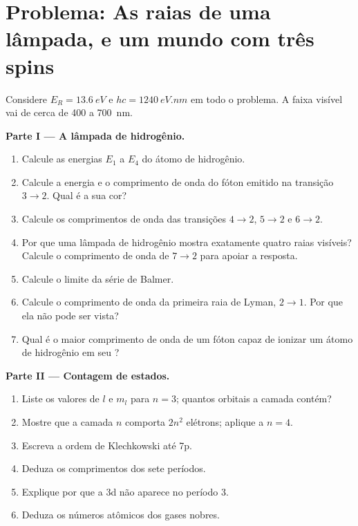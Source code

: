 \section{Problema: As raias de uma lâmpada, e um mundo com três spins}

\begin{problem}
\label{pb:b1:quantum-numbers:1}
Considere $E_R = \qty{13.6}{eV}$ e $hc = \qty{1240}{eV.nm}$ em todo o problema.
A faixa visível vai de cerca de 400 a \qty{700}{nm}.

\medskip
\noindent\textbf{Parte I --- A lâmpada de hidrogênio.}
\begin{enumerate}
  \item Calcule as energias $E_1$ a $E_4$ do átomo de hidrogênio.
  \item Calcule a energia e o comprimento de onda do fóton emitido na
        transição $3 \to 2$. Qual é a sua cor?
  \item Calcule os comprimentos de onda das transições $4 \to 2$, $5 \to 2$
        e $6 \to 2$.
  \item Por que uma lâmpada de hidrogênio mostra exatamente quatro raias
        visíveis? Calcule o comprimento de onda de $7 \to 2$ para apoiar a resposta.
  \item Calcule o limite da série de Balmer.
  \item Calcule o comprimento de onda da primeira raia de Lyman, $2 \to 1$.
        Por que ela não pode ser vista?
  \item Qual é o maior comprimento de onda de um fóton capaz de ionizar
        um átomo de hidrogênio em seu ?
\end{enumerate}

\medskip
\noindent\textbf{Parte II --- Contagem de estados.}
\begin{enumerate}[resume]
  \item Liste os valores de $l$ e $m_l$ para $n = 3$; quantos orbitais
        a camada contém?
  \item Mostre que a camada $n$ comporta $2n^2$ elétrons; aplique a $n = 4$.
  \item Escreva a ordem de Klechkowski até 7p.
  \item Deduza os comprimentos dos sete períodos.
  \item Explique por que a  3d não aparece no período 3.
  \item Deduza os números atômicos dos gases nobres.
\end{enumerate}


\end{problem}
